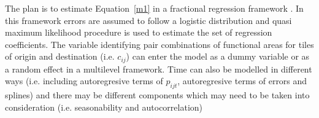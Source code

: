 \documentclass[11pt,letterpaper]{article}
\begin{document}
The plan is to estimate Equation~\ref{m1} in a fractional regression framework \citep[see][]{papke1996econometric}. 
In this framework errors are assumed to follow a logistic distribution and quasi maximum likelihood procedure is used to estimate the set of regression coefficients.
The variable identifying pair combinations of functional areas for tiles of origin and destination (i.e. $c_{ij}$) can enter the model as a dummy variable or as a random effect in a multilevel framework.
Time can also be modelled in different ways (i.e. including autoregresive terms of $p_{ijt}$, autoregresive terms of errors and splines) and there may be different components which may need to be taken into consideration (i.e. seasonability and autocorrelation)

\newpage

\setlength{\bibsep}{0.00cm plus 0.05cm} %


\end{document}
